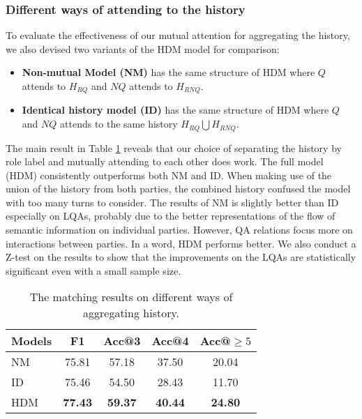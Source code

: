 \subsubsection*{Different ways of attending to the history}

To evaluate the effectiveness of our mutual attention for aggregating the 
history, we also devised two variants of the HDM model for comparison:
\begin{itemize}
	\item \textbf{Non-mutual Model (NM)} has the same structure of HDM 
where $Q$ attends to $H_{RQ}$ and $NQ$ attends to $H_{RNQ}$.
	\item \textbf{Identical history model (ID)} has the same structure of HDM where $Q$ and $NQ$ attends to the same history $H_{RQ}\bigcup H_{RNQ}$.
\end{itemize}

The main result in Table \ref{tab:historyways} reveals that our choice 
of separating the history by role label and mutually attending to each other
does work. The full model (HDM) consistently outperforms both NM and ID. 
When making use of the union of the history from both parties, 
the combined history confused the model with too many turns to consider. 
The results of NM is slightly better than ID especially on LQAs, probably 
due to the better representations of the flow of semantic information on 
individual parties. However, QA relations focus more on interactions 
between parties. In a word, HDM performs better. We also conduct a Z-test on the 
results to show that the improvements on the LQAs are statistically 
significant even with a small sample size.

\begin{table}[th]
	\small
	\centering
	\begin{tabular}{p{1.5cm}<{\centering}|c|ccc}
	\toprule[1.3pt]
	Models &F1&Acc@3&Acc@4&Acc@$\geq5$\\
	\midrule[1pt]
	NM&75.81&57.18&37.50&20.04 \\	
	ID&75.46&54.50&28.43&11.70\\
	HDM&\textbf{77.43}&\textbf{59.37}&\textbf{40.44}&\textbf{24.80}\\
	\bottomrule[1.3pt]
\end{tabular}
	\caption{The matching results on different ways of aggregating history.}
	\label{tab:historyways}
\end{table}


